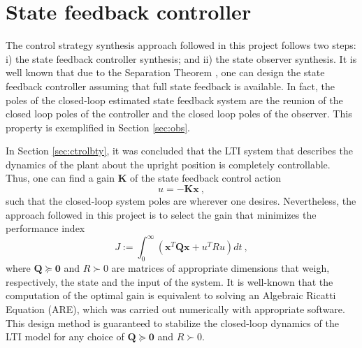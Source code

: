 \documentclass[letterpaper, 10 pt, conference]{ieeeconf}
\begin{document}

\section{State feedback controller}\label{sec:ctr}
The control strategy synthesis approach followed in this project follows two steps: i) the state feedback controller synthesis; and ii) the state observer synthesis. It is well known that due to the Separation Theorem \cite[Chapter 15]{rugh1996linear}, one can design the state feedback controller assuming that full state feedback is available. In fact, the poles of the closed-loop estimated state feedback system are the reunion of the closed loop poles of the controller and the closed loop poles of the observer. This property is exemplified in Section \ref{sec:obs}.

In Section \ref{sec:ctrolbty}, it was concluded that the LTI system that describes the dynamics of the plant about the upright position is completely controllable. Thus, one can find a gain $\mathbf{K}$ of the state feedback control action
\begin{equation*}
    u = -\mathbf{K x}\:,
\end{equation*}  
such that the closed-loop system poles are wherever one desires. Nevertheless, the approach followed in this project is to select the gain that minimizes the performance index
\begin{equation}\label{eq:idx}
    J := \int_0^\infty (\mathbf{x}^T \mathbf{Q} \mathbf{x} + u^T R u) dt\:,
\end{equation}
where $\mathbf{Q}\succeq \mathbf 0$ and $R \succ 0$ are matrices of appropriate dimensions that weigh, respectively, the state and the input of the system. It is well-known that the computation of the optimal gain is equivalent to solving an Algebraic Ricatti Equation (ARE), which was carried out numerically with appropriate software. This design method is guaranteed to stabilize the closed-loop dynamics \cite[Section 3.2]{anderson2007optimal} of the LTI model for any choice of $\mathbf{Q}\succeq \mathbf 0$ and $R \succ 0$. 
\end{document}
